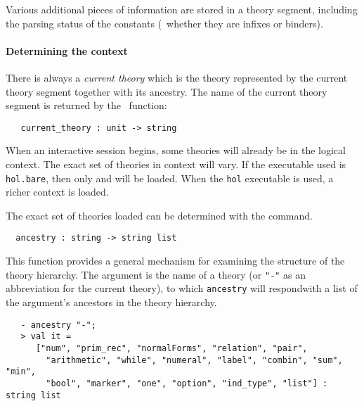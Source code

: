Various additional pieces of information are stored in a theory
segment, including the parsing status of the constants (\eg\ whether
they are infixes or binders).

\paragraph {Determining the context}

There is always a \emph{current theory} which is the theory
represented by the current theory segment together with its
ancestry. The name of the current theory segment is returned by the \ML\
function:

\begin{boxed}
\begin{verbatim}
   current_theory : unit -> string
\end{verbatim}
\end{boxed}

  When an interactive \HOL{} session begins, some theories will
  already be in the logical context. The exact set of theories in
  context will vary.  If the executable used is \texttt{hol.bare},
  then only \theoryimp{min} and \theoryimp{bool} will be loaded.  When
  the \texttt{hol} executable is used, a richer context is loaded.

The exact set of theories loaded can be determined with the
 command.
%
\begin{boxed}
\begin{verbatim}
  ancestry : string -> string list
\end{verbatim}
\end{boxed}

This function provides a general mechanism for examining the structure
of the theory hierarchy.  The argument is the name of a theory (or
\texttt{"-"} as an abbreviation for the current theory), to which
\texttt{ancestry} will respondwith a list of the argument's ancestors
in the theory hierarchy.

\begin{boxed}
{\small
\begin{verbatim}
   - ancestry "-";
   > val it =
      ["num", "prim_rec", "normalForms", "relation", "pair",
        "arithmetic", "while", "numeral", "label", "combin", "sum", "min",
        "bool", "marker", "one", "option", "ind_type", "list"] : string list
\end{verbatim}
}
\end{boxed}


